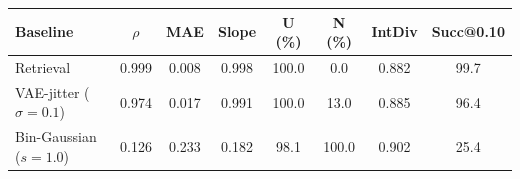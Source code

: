 \begin{tabular}{l c c c c c c c}
\toprule
Baseline & $\rho$ & MAE & Slope & U (\%) & N (\%) & IntDiv & Succ@0.10 \\
\midrule
Retrieval & 0.999 & 0.008 & 0.998 & 100.0 & 0.0 & 0.882 & 99.7 \\
VAE-jitter ($\sigma=0.1$) & 0.974 & 0.017 & 0.991 & 100.0 & 13.0 & 0.885 & 96.4 \\
Bin-Gaussian ($s=1.0$) & 0.126 & 0.233 & 0.182 & 98.1 & 100.0 & 0.902 & 25.4 \\
\bottomrule
\end{tabular}
